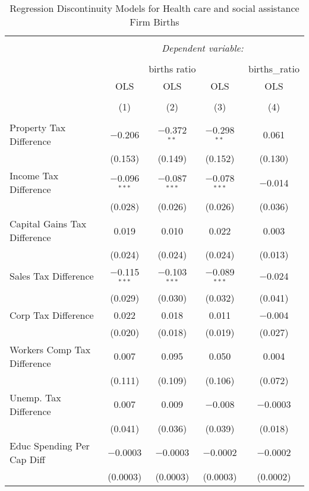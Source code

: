 
\begin{table}[!htbp] \centering 
  \caption{Regression Discontinuity Models for  Health care and social assistance Firm Births} 
  \label{62rd} 
\begin{tabular}{@{\extracolsep{5pt}}lcccc} 
\\[-1.8ex]\hline 
\hline \\[-1.8ex] 
 & \multicolumn{4}{c}{\textit{Dependent variable:}} \\ 
\cline{2-5} 
\\[-1.8ex] & \multicolumn{3}{c}{births ratio} & births\_ratio \\ 
 & OLS & OLS & OLS & OLS \\ 
\\[-1.8ex] & (1) & (2) & (3) & (4)\\ 
\hline \\[-1.8ex] 
 Property Tax Difference & $-$0.206 & $-$0.372$^{**}$ & $-$0.298$^{**}$ & 0.061 \\ 
  & (0.153) & (0.149) & (0.152) & (0.130) \\ 
  Income Tax Difference & $-$0.096$^{***}$ & $-$0.087$^{***}$ & $-$0.078$^{***}$ & $-$0.014 \\ 
  & (0.028) & (0.026) & (0.026) & (0.036) \\ 
  Capital Gains Tax Difference & 0.019 & 0.010 & 0.022 & 0.003 \\ 
  & (0.024) & (0.024) & (0.024) & (0.013) \\ 
  Sales Tax Difference & $-$0.115$^{***}$ & $-$0.103$^{***}$ & $-$0.089$^{***}$ & $-$0.024 \\ 
  & (0.029) & (0.030) & (0.032) & (0.041) \\ 
  Corp Tax Difference & 0.022 & 0.018 & 0.011 & $-$0.004 \\ 
  & (0.020) & (0.018) & (0.019) & (0.027) \\ 
  Workers Comp Tax Difference & 0.007 & 0.095 & 0.050 & 0.004 \\ 
  & (0.111) & (0.109) & (0.106) & (0.072) \\ 
  Unemp. Tax Difference & 0.007 & 0.009 & $-$0.008 & $-$0.0003 \\ 
  & (0.041) & (0.036) & (0.039) & (0.018) \\ 
  Educ Spending Per Cap Diff & $-$0.0003 & $-$0.0003 & $-$0.0002 & $-$0.0002 \\ 
  & (0.0003) & (0.0003) & (0.0003) & (0.0002) \\ 

\end{tabular}
\end{table}

